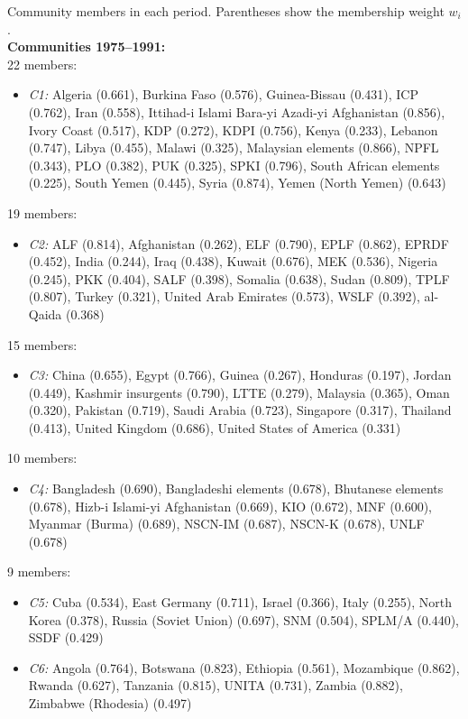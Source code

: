 Community members in each period. Parentheses show the membership weight $w_i$.\\
\textbf{Communities 1975--1991:}\\
22 members:
\begin{itemize}[noitemsep, topsep=0pt]
    \item \textit{C1:} Algeria (0.661), Burkina Faso (0.576), Guinea-Bissau (0.431), ICP (0.762), Iran (0.558), Ittihad-i Islami Bara-yi Azadi-yi Afghanistan (0.856), Ivory Coast (0.517), KDP (0.272), KDPI (0.756), Kenya (0.233), Lebanon (0.747), Libya (0.455), Malawi (0.325), Malaysian elements (0.866), NPFL (0.343), PLO (0.382), PUK (0.325), SPKI (0.796), South African elements (0.225), South Yemen (0.445), Syria (0.874), Yemen (North Yemen) (0.643)
\end{itemize}
19 members:
\begin{itemize}[noitemsep, topsep=0pt]
    \item \textit{C2:} ALF (0.814), Afghanistan (0.262), ELF (0.790), EPLF (0.862), EPRDF (0.452), India (0.244), Iraq (0.438), Kuwait (0.676), MEK (0.536), Nigeria (0.245), PKK (0.404), SALF (0.398), Somalia (0.638), Sudan (0.809), TPLF (0.807), Turkey (0.321), United Arab Emirates (0.573), WSLF (0.392), al-Qaida (0.368)
\end{itemize}
15 members:
\begin{itemize}[noitemsep, topsep=0pt]
    \item \textit{C3:} China (0.655), Egypt (0.766), Guinea (0.267), Honduras (0.197), Jordan (0.449), Kashmir insurgents (0.790), LTTE (0.279), Malaysia (0.365), Oman (0.320), Pakistan (0.719), Saudi Arabia (0.723), Singapore (0.317), Thailand (0.413), United Kingdom (0.686), United States of America (0.331)
\end{itemize}
10 members:
\begin{itemize}[noitemsep, topsep=0pt]
    \item \textit{C4:} Bangladesh (0.690), Bangladeshi elements (0.678), Bhutanese elements (0.678), Hizb-i Islami-yi Afghanistan (0.669), KIO (0.672), MNF (0.600), Myanmar (Burma) (0.689), NSCN-IM (0.687), NSCN-K (0.678), UNLF (0.678)
\end{itemize}
9 members:
\begin{itemize}[noitemsep, topsep=0pt]
    \item \textit{C5:} Cuba (0.534), East Germany (0.711), Israel (0.366), Italy (0.255), North Korea (0.378), Russia (Soviet Union) (0.697), SNM (0.504), SPLM/A (0.440), SSDF (0.429)
    \item \textit{C6:} Angola (0.764), Botswana (0.823), Ethiopia (0.561), Mozambique (0.862), Rwanda (0.627), Tanzania (0.815), UNITA (0.731), Zambia (0.882), Zimbabwe (Rhodesia) (0.497)
\end{itemize}
